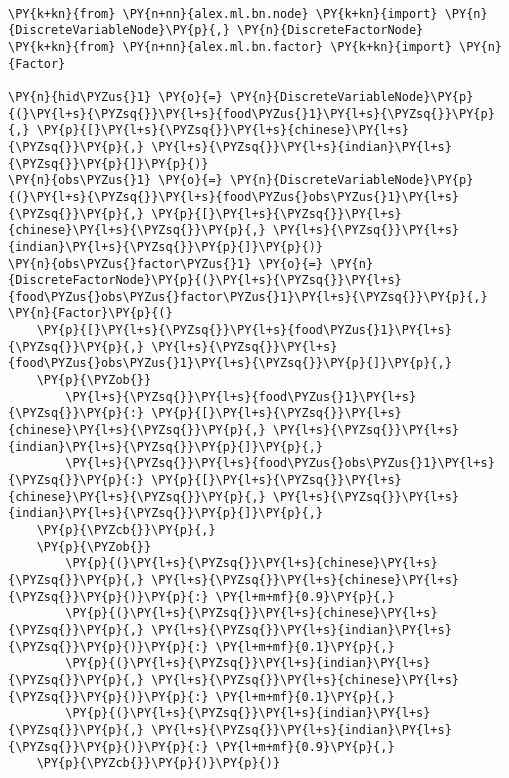 \begin{example}
\begin{Verbatim}[commandchars=\\\{\}, fontsize=\relsize{-1}]

\PY{k+kn}{from} \PY{n+nn}{alex.ml.bn.node} \PY{k+kn}{import} \PY{n}{DiscreteVariableNode}\PY{p}{,} \PY{n}{DiscreteFactorNode}
\PY{k+kn}{from} \PY{n+nn}{alex.ml.bn.factor} \PY{k+kn}{import} \PY{n}{Factor}

\PY{n}{hid\PYZus{}1} \PY{o}{=} \PY{n}{DiscreteVariableNode}\PY{p}{(}\PY{l+s}{\PYZsq{}}\PY{l+s}{food\PYZus{}1}\PY{l+s}{\PYZsq{}}\PY{p}{,} \PY{p}{[}\PY{l+s}{\PYZsq{}}\PY{l+s}{chinese}\PY{l+s}{\PYZsq{}}\PY{p}{,} \PY{l+s}{\PYZsq{}}\PY{l+s}{indian}\PY{l+s}{\PYZsq{}}\PY{p}{]}\PY{p}{)}
\PY{n}{obs\PYZus{}1} \PY{o}{=} \PY{n}{DiscreteVariableNode}\PY{p}{(}\PY{l+s}{\PYZsq{}}\PY{l+s}{food\PYZus{}obs\PYZus{}1}\PY{l+s}{\PYZsq{}}\PY{p}{,} \PY{p}{[}\PY{l+s}{\PYZsq{}}\PY{l+s}{chinese}\PY{l+s}{\PYZsq{}}\PY{p}{,} \PY{l+s}{\PYZsq{}}\PY{l+s}{indian}\PY{l+s}{\PYZsq{}}\PY{p}{]}\PY{p}{)}
\PY{n}{obs\PYZus{}factor\PYZus{}1} \PY{o}{=} \PY{n}{DiscreteFactorNode}\PY{p}{(}\PY{l+s}{\PYZsq{}}\PY{l+s}{food\PYZus{}obs\PYZus{}factor\PYZus{}1}\PY{l+s}{\PYZsq{}}\PY{p}{,} \PY{n}{Factor}\PY{p}{(}
    \PY{p}{[}\PY{l+s}{\PYZsq{}}\PY{l+s}{food\PYZus{}1}\PY{l+s}{\PYZsq{}}\PY{p}{,} \PY{l+s}{\PYZsq{}}\PY{l+s}{food\PYZus{}obs\PYZus{}1}\PY{l+s}{\PYZsq{}}\PY{p}{]}\PY{p}{,}
    \PY{p}{\PYZob{}}
        \PY{l+s}{\PYZsq{}}\PY{l+s}{food\PYZus{}1}\PY{l+s}{\PYZsq{}}\PY{p}{:} \PY{p}{[}\PY{l+s}{\PYZsq{}}\PY{l+s}{chinese}\PY{l+s}{\PYZsq{}}\PY{p}{,} \PY{l+s}{\PYZsq{}}\PY{l+s}{indian}\PY{l+s}{\PYZsq{}}\PY{p}{]}\PY{p}{,}
        \PY{l+s}{\PYZsq{}}\PY{l+s}{food\PYZus{}obs\PYZus{}1}\PY{l+s}{\PYZsq{}}\PY{p}{:} \PY{p}{[}\PY{l+s}{\PYZsq{}}\PY{l+s}{chinese}\PY{l+s}{\PYZsq{}}\PY{p}{,} \PY{l+s}{\PYZsq{}}\PY{l+s}{indian}\PY{l+s}{\PYZsq{}}\PY{p}{]}\PY{p}{,}
    \PY{p}{\PYZcb{}}\PY{p}{,}
    \PY{p}{\PYZob{}}
        \PY{p}{(}\PY{l+s}{\PYZsq{}}\PY{l+s}{chinese}\PY{l+s}{\PYZsq{}}\PY{p}{,} \PY{l+s}{\PYZsq{}}\PY{l+s}{chinese}\PY{l+s}{\PYZsq{}}\PY{p}{)}\PY{p}{:} \PY{l+m+mf}{0.9}\PY{p}{,}
        \PY{p}{(}\PY{l+s}{\PYZsq{}}\PY{l+s}{chinese}\PY{l+s}{\PYZsq{}}\PY{p}{,} \PY{l+s}{\PYZsq{}}\PY{l+s}{indian}\PY{l+s}{\PYZsq{}}\PY{p}{)}\PY{p}{:} \PY{l+m+mf}{0.1}\PY{p}{,}
        \PY{p}{(}\PY{l+s}{\PYZsq{}}\PY{l+s}{indian}\PY{l+s}{\PYZsq{}}\PY{p}{,} \PY{l+s}{\PYZsq{}}\PY{l+s}{chinese}\PY{l+s}{\PYZsq{}}\PY{p}{)}\PY{p}{:} \PY{l+m+mf}{0.1}\PY{p}{,}
        \PY{p}{(}\PY{l+s}{\PYZsq{}}\PY{l+s}{indian}\PY{l+s}{\PYZsq{}}\PY{p}{,} \PY{l+s}{\PYZsq{}}\PY{l+s}{indian}\PY{l+s}{\PYZsq{}}\PY{p}{)}\PY{p}{:} \PY{l+m+mf}{0.9}\PY{p}{,}
    \PY{p}{\PYZcb{}}\PY{p}{)}\PY{p}{)}


\end{Verbatim}
\end{example}
